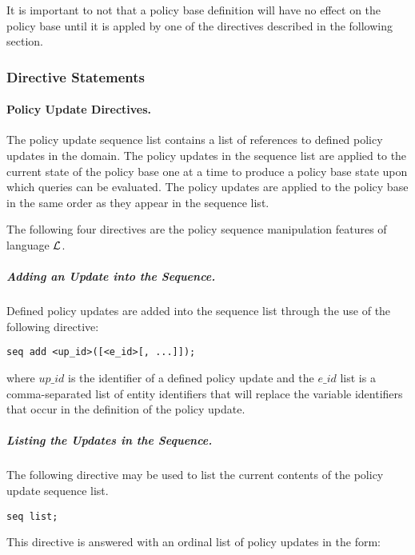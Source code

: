 \documentclass[10pt, twocolumn]{article}
\begin{document}
          It is important to not that a policy base definition will have no
          effect on the policy base until it is appled by one of the directives
          described in the following section.

        \subsubsection{Directive Statements}

        \paragraph{Policy Update Directives.}

        The policy update sequence list contains a list of references to
        defined policy updates in the domain. The policy updates in the
        sequence list are applied to the current state of the policy base one
        at a time to produce a policy base state upon which queries can be
        evaluated. The policy updates are applied to the policy base in the
        same order as they appear in the sequence list.

        The following four directives are the policy sequence manipulation
        features of language $\cal{L}$.

        \subparagraph{Adding an Update into the Sequence.}
          Defined policy updates are added into the sequence list through the
          use of the following directive:

          \begin{verbatim}seq add <up_id>([<e_id>[, ...]]);\end{verbatim}

          \noindent where $up\_id$ is the identifier of a defined policy
          update and the $e\_id$ list is a comma-separated list of entity
          identifiers that will replace the variable identifiers that occur in
          the definition of the policy update. 

        \subparagraph{Listing the Updates in the Sequence.}
          The following directive may be used to list the current contents of
          the policy update sequence list.

          \begin{verbatim}seq list;\end{verbatim}

          This directive is answered with an ordinal list of policy updates in
          the form:
\end{document}
